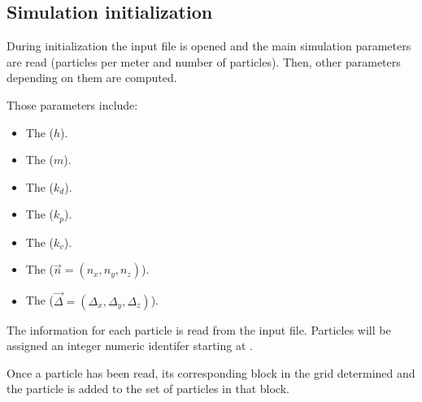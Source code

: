 \subsection{Simulation initialization}

During initialization the input file is opened and the main simulation
parameters are read (particles per meter and number of particles).
Then, other parameters depending on them are computed.

Those parameters include:
\begin{itemize}
\item The  ($h$).
\item The  ($m$).
\item The  ($k_d$).
\item The  ($k_p$).
\item The  ($k_v$).
\item The  ($\vec{n} = (n_x, n_y, n_z)$).
\item The  ($\vec{\Delta} = (\Delta_x, \Delta_y,
\Delta_z)$).
\end{itemize}

The information for each particle is read from the input file. Particles will be
assigned an integer numeric identifer starting at .

Once a particle has been read, its corresponding block in the grid determined
and the particle is added to the set of particles in that block. 
